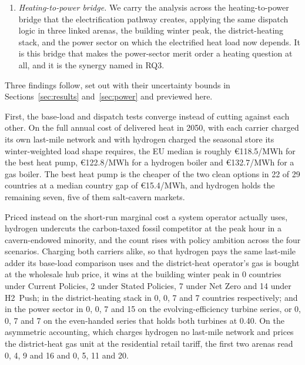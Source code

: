 \begin{enumerate}
heating problem onto the power sector and its scarcest winter evenings. That displaced
load is priced the way a system operator actually prices electricity, by short-run
marginal cost at each hour. Hydrogen enters at
  both the first and the last of those steps, as a base-load competitor on annual
  cost in the countries where retail electricity is dearest, and again as a
  candidate peaker competing on operating cost against the carbon-taxed gas plant.
  Hydrogen is represented along its full supply chain, from production route and
  import corridor through seasonal storage to the distribution network, with a
  geographically bounded storage adder of roughly \euro{}50/MWh in countries with
  salt-cavern endowment and roughly \euro{}100/MWh where caverns are absent.
  \item \emph{Heating-to-power bridge.} We carry the analysis across the
  heating-to-power bridge that the electrification pathway creates, applying the
  same dispatch logic in three linked arenas, the building winter peak, the
  district-heating stack, and the power sector on which the electrified heat load
  now depends. It is this bridge that makes the power-sector merit order a heating
  question at all, and it is the synergy named in RQ3.
\end{enumerate}

Three findings follow, set out with their uncertainty bounds in
Sections~\ref{sec:results} and~\ref{sec:power} and previewed here.

First, the base-load and dispatch tests converge instead of cutting against each
other. On the full annual cost of delivered heat in 2050, with each carrier charged
its own last-mile network and with hydrogen charged the seasonal store its
winter-weighted load shape requires, the EU median is roughly \euro{}118.5/MWh for the
best heat pump, \euro{}122.8/MWh for a hydrogen boiler and \euro{}132.7/MWh for a gas
boiler. The best heat pump is the cheaper of the two clean options in 22 of 29
countries at a median country gap of \euro{}15.4/MWh, and hydrogen holds the remaining
seven, five of them salt-cavern markets.

Priced instead on the short-run marginal cost a system operator actually uses, hydrogen undercuts the carbon-taxed fossil competitor
at the peak hour in a cavern-endowed minority, and the count rises with policy
ambition across the four scenarios. Charging both carriers alike, so that hydrogen pays
the same last-mile adder its base-load comparison uses and the district-heat operator's
gas is bought at the wholesale hub price, it wins at the building winter peak in 0
countries under Current Policies, 2 under Stated Policies, 7 under Net Zero and 14 under
H2~Push; in the district-heating stack in 0, 0, 7 and 7 countries respectively; and
in the power sector in 0, 0, 7 and 15 on the evolving-efficiency turbine series, or
0, 0, 7 and 7 on the even-handed series that holds both turbines at 0.40. On the
asymmetric accounting, which charges hydrogen no last-mile
network and prices the district-heat gas unit at the residential retail tariff, the first
two arenas read 0, 4, 9 and 16 and 0, 5, 11 and 20.


